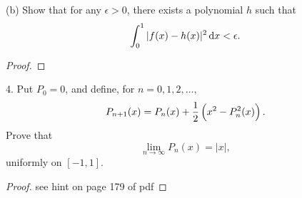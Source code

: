 \documentclass{article}
\begin{document}
(b) Show that for any $\epsilon > 0$, there exists a polynomial $h$ such that
%
\begin{equation*}
    \int_0^1 |f(x) - h(x)|^2 \dif x < \epsilon
    .
\end{equation*}

\begin{proof}

\end{proof}

\newpage

4. Put $P_0 = 0$, and define, for $n = 0, 1, 2, \ldots,$
%
\begin{equation*}
    P_{n + 1}(x) = P_n(x) + \frac{1}{2} \del{x^2 - P_n^2(x)}
    .
\end{equation*}
%
Prove that
%
\begin{equation*}
    \lim_{n \to \infty} P_n(x) = |x|
    ,
\end{equation*}
%
uniformly on $[-1, 1]$.

\begin{proof}

see hint on page 179 of pdf

\end{proof}
\end{document}
